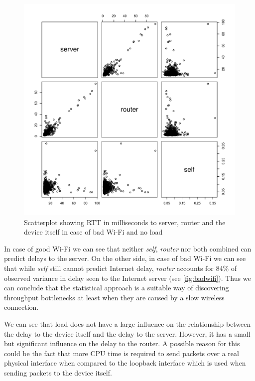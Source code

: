 \documentclass{sig-alternate-10pt}
\begin{document}
\begin{figure}[tbh]
\begin{center}
\includegraphics[width=\columnwidth]{figures/Rplots_bad_new}
\end{center}
\caption{Scatterplot showing RTT in milliseconds to server, router and the device itself in case of bad Wi-Fi and no load}\label{fig:badwifi}
\end{figure}

In case of good Wi-Fi we can see that neither \textit{self}, \textit{router} nor both combined can predict delays to the server. On the other side, in case of bad Wi-Fi we can see that while \textit{self} still cannot predict Internet delay, \textit{router} accounts for 84\% of observed variance in delay seen to the Internet server (see \autoref{fig:badwifi}). Thus we can conclude that the statistical approach is a suitable way of discovering throughput bottlenecks at least when they are caused by a slow wireless connection. 

We can see that load does not have a large influence on the relationship between the delay to the device itself and the delay to the server. However, it has a small but significant influence on the delay to the router. A possible reason for this could be the fact that more CPU time is required to send packets over a real physical interface when compared to the loopback interface which is used when sending packets to the device itself. 
\end{document}
